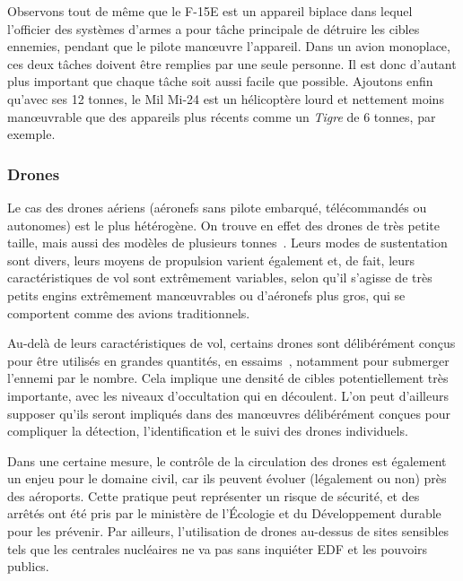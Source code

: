 	Observons tout de même que le F-15E est un appareil biplace dans lequel l'officier des systèmes d'armes a pour tâche principale de détruire les cibles ennemies, pendant que le pilote man\oe{}uvre l'appareil. Dans un avion monoplace, ces deux tâches doivent être remplies par une seule personne. Il est donc d'autant plus important que chaque tâche soit aussi facile que possible. Ajoutons enfin qu'avec ses 12 tonnes, le Mil Mi-24 est un hélicoptère lourd et nettement moins man\oe{}uvrable que des appareils plus récents comme un \emph{Tigre} de 6 tonnes, par exemple.
	
	\subsubsection{Drones}
	Le cas des drones aériens (aéronefs sans pilote embarqué, télécommandés ou autonomes) est le plus hétérogène. On trouve en effet des drones de très petite taille, mais aussi des modèles de plusieurs tonnes~\footnotemark. Leurs modes de sustentation sont divers, leurs moyens de propulsion varient également et, de fait, leurs caractéristiques de vol sont extrêmement variables, selon qu'il s'agisse de très petits engins extrêmement manœuvrables ou d'aéronefs plus gros, qui se comportent comme des avions traditionnels.

	
	Au-delà de leurs caractéristiques de vol, certains drones sont délibérément conçus pour être utilisés en grandes quantités, en essaims\footnotemark~\cite{alonso2016distributed, saska2014autonomous}, notamment pour submerger l'ennemi par le nombre. Cela implique une densité de cibles potentiellement très importante, avec les niveaux d'occultation qui en découlent. L'on peut d'ailleurs supposer qu'ils seront impliqués dans des manœuvres délibérément conçues pour compliquer la détection, l'identification et le suivi des drones individuels.
	
	
	
	Dans une certaine mesure, le contrôle de la circulation des drones est également un enjeu pour le domaine civil, car ils peuvent évoluer (légalement ou non) près des aéroports. Cette pratique peut représenter un risque de sécurité, et des arrêtés ont été pris par le ministère de l'Écologie et du Développement durable pour les prévenir\footnotemark. Par ailleurs, l'utilisation de drones au-dessus de sites sensibles tels que les centrales nucléaires ne va pas sans inquiéter EDF et les pouvoirs publics\footnotemark.
	

